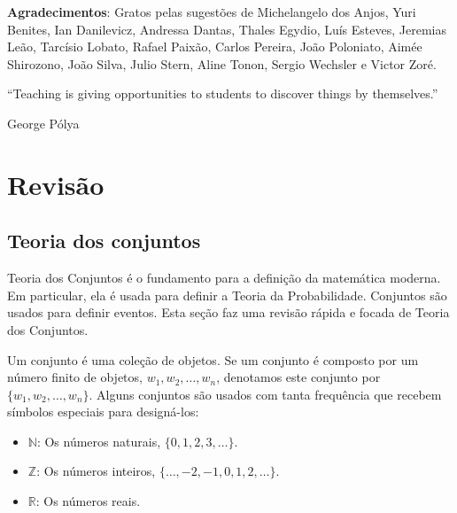 



\maketitle

\vspace{20mm}

\textbf{Agradecimentos}: Gratos pelas sugestões de
Michelangelo dos Anjos, Yuri Benites, Ian Danilevicz, Andressa Dantas, Thales Egydio, Luís Esteves, Jeremias Leão, Tarcísio Lobato, Rafael Paixão, Carlos Pereira, João Poloniato,  Aimée Shirozono, João Silva, Julio Stern, Aline Tonon, Sergio Wechsler e Victor Zoré.

\newpage


\epigraph{
``Teaching is giving opportunities to students to discover things by themselves.''
}
{George P\'olya}
 
 
\newpage
 
\tableofcontents
  
\newpage




\section{Revisão}
\label{sec:prologue}

\subsection{Teoria dos conjuntos}
\label{sec:sets}
  
	Teoria dos Conjuntos é o fundamento para a definição da matemática moderna.
	Em particular, ela é usada para definir a Teoria da Probabilidade.
	Conjuntos são usados para definir eventos.
	Esta seção faz uma revisão rápida e focada de Teoria dos Conjuntos.
  
	Um conjunto é uma coleção de objetos.
	Se um conjunto é composto por um número finito de objetos, $w_{1}, w_{2}, \ldots, w_{n}$,
	denotamos este conjunto por $\{w_{1},w_{2},\ldots,w_{n}\}$.
	Alguns conjuntos são usados com tanta frequência que recebem símbolos especiais para designá-los:
	\begin{itemize}
	 \item $\mathbb{N}$: Os números naturais, $\{0,1,2,3,\ldots\}$.
	 \item $\mathbb{Z}$: Os números inteiros, $\{\ldots,-2,-1,0,1,2,\ldots\}$.
	 \item $\mathbb{R}$: Os números reais.
	\end{itemize}
  
